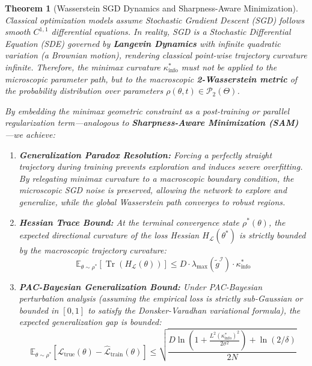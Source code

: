 \documentclass[11pt,reqno]{amsart}
\newtheorem{theorem}{Theorem}[section]
\theoremstyle{definition}
\newcommand{\E}{\mathbb{E}}
\newcommand{\Fisher}{\mathcal{I}}
\newcommand{\Loss}{\mathcal{L}}
\numberwithin{equation}{section}
\begin{document}
\begin{theorem}[Wasserstein SGD Dynamics and Sharpness-Aware Minimization]
\label{thm:generalization_bound}
Classical optimization models assume Stochastic Gradient Descent (SGD) follows smooth $C^{1,1}$ differential equations. In reality, SGD is a Stochastic Differential Equation (SDE) governed by \textbf{Langevin Dynamics} with infinite quadratic variation (a Brownian motion), rendering classical point-wise trajectory curvature infinite.
Therefore, the minimax curvature $\kappa^*_{\mathrm{info}}$ must not be applied to the microscopic parameter path, but to the macroscopic \textbf{2-Wasserstein metric} of the probability distribution over parameters $\rho(\theta, t) \in \mathcal{P}_2(\Theta)$. 

By embedding the minimax geometric constraint as a post-training or parallel regularization term—analogous to \textbf{Sharpness-Aware Minimization (SAM)} \cite{foret2020}—we achieve:
\begin{enumerate}
    \item \textbf{Generalization Paradox Resolution:} Forcing a perfectly straight trajectory during training prevents exploration and induces severe overfitting. By relegating minimax curvature to a macroscopic boundary condition, the microscopic SGD noise is preserved, allowing the network to explore and generalize, while the global Wasserstein path converges to robust regions.
    \item \textbf{Hessian Trace Bound:} At the terminal convergence state $\rho^*(\theta)$, the expected directional curvature of the loss Hessian $H_{\Loss}(\theta^*)$ is strictly bounded by the macroscopic trajectory curvature:
    \begin{equation}
    \E_{\theta \sim \rho^*} [\operatorname{Tr}(H_{\Loss}(\theta))] \le D \cdot \lambda_{\max}(\tilde{g}^{\Fisher}) \cdot \kappa^*_{\mathrm{info}}
    \end{equation}
    \item \textbf{PAC-Bayesian Generalization Bound:} Under PAC-Bayesian perturbation analysis (assuming the empirical loss is strictly sub-Gaussian or bounded in $[0,1]$ to satisfy the Donsker-Varadhan variational formula), the expected generalization gap is bounded:
    \begin{equation}
    \E_{\theta \sim \rho^*} \left[ \Loss_{\mathrm{true}}(\theta) - \hat{\Loss}_{\mathrm{train}}(\theta) \right] \le \sqrt{ \frac{D \ln\left(1 + \frac{L^2 (\kappa^*_{\mathrm{info}})^2}{2\sigma^2}\right) + \ln(2/\delta)}{2 N} }
    \end{equation}
\end{enumerate}
\end{theorem}
\end{document}
